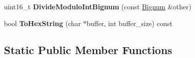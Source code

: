 \begin{DoxyCompactItemize}
\item 
\hypertarget{classv8_1_1internal_1_1_bignum_a7632eadb7f993623a031ba700c5d4ca1}{}uint16\+\_\+t {\bfseries Divide\+Modulo\+Int\+Bignum} (const \hyperlink{classv8_1_1internal_1_1_bignum}{Bignum} \&other)\label{classv8_1_1internal_1_1_bignum_a7632eadb7f993623a031ba700c5d4ca1}

\item 
\hypertarget{classv8_1_1internal_1_1_bignum_a655807878ae634cb6b3935325734fb7d}{}bool {\bfseries To\+Hex\+String} (char $\ast$buffer, int buffer\+\_\+size) const \label{classv8_1_1internal_1_1_bignum_a655807878ae634cb6b3935325734fb7d}

\end{DoxyCompactItemize}
\subsection*{Static Public Member Functions}
